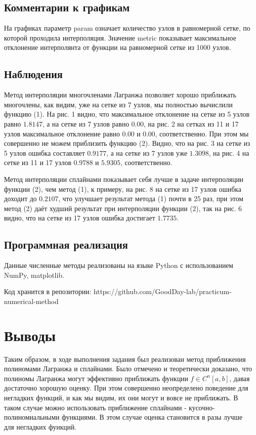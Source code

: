 \documentclass{article}
\begin{document}
\subsection{Комментарии к графикам}
На графиках параметр {\large param} означает количество узлов в равномерной сетке, по которой проходила интерполяция. Значение {\large metric} показывает максимальное отклонение  интерполянта от функции на равномерной сетке из 1000 узлов.

\subsection{Наблюдения}
Метод интерполяции многочленами Лагранжа позволяет хорошо приближать многочлены, как видим, уже на сетке из 7 узлов, мы полностью вычислили функцию (1). На рис. 1 видно, что максимальное отклонение на сетке из 5 узлов равно \(1.8147\), а на сетке из 7 узлов равно \(0.00\), на рис. 2 на сетках из 11 и 17 узлов максимальное отклонение равно \(0.00\) и \(0.00\), соответственно.
При этом мы совершенно не можем приблизить функцию (2).
Видно, что на рис. 3 на сетке из 5 узлов ошибка составляет \(0.9177\), а на сетке из 7 узлов уже \(1.3098\), на рис. 4 на сетке из 11 и 17 узлов \(0.9788\) и \(5.9305\), соответственно.

Метод интерполяции сплайнами показывает себя лучше в задаче интерполяции функции (2), чем метод (1), к примеру, на рис. 8 на сетке из 17 узлов ошибка доходит до \(0.2107\), что улучшает результат метода (1) почти в 25 раз, при этом метод (2) даёт худший результат при интерполяции функции (2), так на рис. 6 видно, что на сетке из 17 узлов ошибка достигает \(1.7735\).

\subsection{Программная реализация}
Данные численные методы реализованы на языке Python с использованием NumPy, matplotlib.

Код хранится в репозитории: 
https://github.com/GoodDay-lab/practicum-numerical-method

\section{Выводы}
Таким образом, в ходе выполнения задания был реализован метод приближения полиномами Лагранжа и сплайнами. Было отмечено и теоретически доказано, что полиномы Лагранжа могут эффективно приближать функции \(f \in C^n[a,b]\), давая достаточно хорошую оценку. При этом совершенно неопределено поведение для негладких функций, и как мы видим, их они могут и вовсе не приближать. В таком случае можно использовать приближение сплайнами - кусочно-полиномиальными функциями. В этом случае оценка становится в разы лучше для негладких функций.
\end{document}

